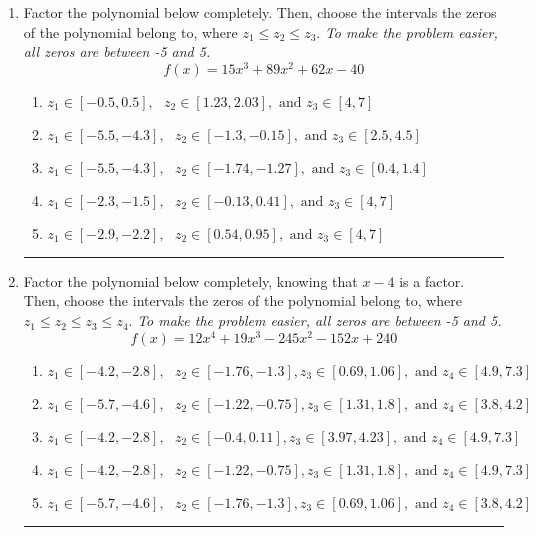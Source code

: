 \documentclass[14pt]{extbook}
\newcommand{\litem}[1]{\item#1\hspace*{-1cm}\rule{\textwidth}{0.4pt}}
\begin{document}
\begin{enumerate}
{\begin{enumerate}[label=\Alph*.]
\end{enumerate} }
\litem{
Factor the polynomial below completely. Then, choose the intervals the zeros of the polynomial belong to, where $z_1 \leq z_2 \leq z_3$. \textit{To make the problem easier, all zeros are between -5 and 5.}\[ f(x) = 15x^{3} +89 x^{2} +62 x -40 \]\begin{enumerate}[label=\Alph*.]
\item \( z_1 \in [-0.5, 0.5], \text{   }  z_2 \in [1.23, 2.03], \text{   and   } z_3 \in [4, 7] \)
\item \( z_1 \in [-5.5, -4.3], \text{   }  z_2 \in [-1.3, -0.15], \text{   and   } z_3 \in [2.5, 4.5] \)
\item \( z_1 \in [-5.5, -4.3], \text{   }  z_2 \in [-1.74, -1.27], \text{   and   } z_3 \in [0.4, 1.4] \)
\item \( z_1 \in [-2.3, -1.5], \text{   }  z_2 \in [-0.13, 0.41], \text{   and   } z_3 \in [4, 7] \)
\item \( z_1 \in [-2.9, -2.2], \text{   }  z_2 \in [0.54, 0.95], \text{   and   } z_3 \in [4, 7] \)

\end{enumerate} }
\litem{
Factor the polynomial below completely, knowing that $x-4$ is a factor. Then, choose the intervals the zeros of the polynomial belong to, where $z_1 \leq z_2 \leq z_3 \leq z_4$. \textit{To make the problem easier, all zeros are between -5 and 5.}\[ f(x) = 12x^{4} +19 x^{3} -245 x^{2} -152 x + 240 \]\begin{enumerate}[label=\Alph*.]
\item \( z_1 \in [-4.2, -2.8], \text{   }  z_2 \in [-1.76, -1.3], z_3 \in [0.69, 1.06], \text{   and   } z_4 \in [4.9, 7.3] \)
\item \( z_1 \in [-5.7, -4.6], \text{   }  z_2 \in [-1.22, -0.75], z_3 \in [1.31, 1.8], \text{   and   } z_4 \in [3.8, 4.2] \)
\item \( z_1 \in [-4.2, -2.8], \text{   }  z_2 \in [-0.4, 0.11], z_3 \in [3.97, 4.23], \text{   and   } z_4 \in [4.9, 7.3] \)
\item \( z_1 \in [-4.2, -2.8], \text{   }  z_2 \in [-1.22, -0.75], z_3 \in [1.31, 1.8], \text{   and   } z_4 \in [4.9, 7.3] \)
\item \( z_1 \in [-5.7, -4.6], \text{   }  z_2 \in [-1.76, -1.3], z_3 \in [0.69, 1.06], \text{   and   } z_4 \in [3.8, 4.2] \)


\end{enumerate}}
\end{enumerate}
\end{document}
